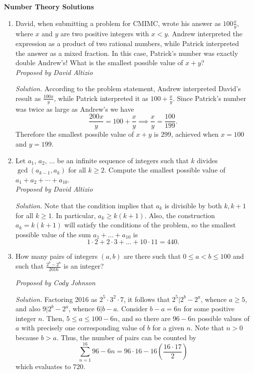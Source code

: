 \documentclass[10pt]{article}
\newcommand{\proposed}[1]
{
\vspace{5pt}
\noindent\textit{Proposed by #1}
}
\newcommand{\solution}
{
\vspace{5pt}
\noindent\textit{Solution.}\qquad
}
\begin{document}
\begin{center}
\huge\textbf{Number Theory Solutions}\normalsize

\vspace{3pt}
\end{center}

\begin{enumerate}
\setlength{\itemsep}{3pt}

\item David, when submitting a problem for CMIMC, wrote his answer as $100\tfrac
	xy$, where $x$ and $y$ are two positive integers with $x<y$. Andrew
	interpreted the expression as a product of two rational numbers, while
	Patrick interpreted the answer as a mixed fraction.  In this case,
	Patrick's number was exactly double Andrew's!  What is the smallest
	possible value of $x+y$? \\

	\proposed{David Altizio}

	\solution According to the problem statement, Andrew interpreted David's
	result as $\frac{100x}{y}$, while Patrick interpreted it as $100 +
	\frac{x}{y}$. Since Patrick's number was twice as large as Andrew's we
	have
	\[
		\frac{200x}{y} = 100 + \frac{x}{y} \implies
		\frac{x}{y} = \frac{100}{199}.
	\]
	Therefore the smallest possible value of $x+y$ is $\boxed{299}$, achieved when
	$x=100$ and $y=199$.



\item Let $a_1$, $a_2$, $\ldots$ be an infinite sequence of integers such that
	$k$ divides $\gcd(a_{k-1},a_k)$ for all $k\geq 2$.  Compute the smallest
	possible value of $a_1+a_2+\cdots+a_{10}$. \\%

	\proposed{David Altizio}

	\solution Note that the condition implies that $a_{k}$ is divisible by
	both $k,k+1$ for all $k \geq 1$. In particular, $a_{k} \geq k(k+1)$.
	Also, the construction $a_{k} = k(k+1)$ will satisfy the conditions of
	the problem, so the smallest possible value of the sum $a_{1} + \ldots +
	a_{10}$ is
	\[
		1 \cdot 2 + 2 \cdot 3 + \ldots + 10\cdot 11 = \boxed{440}.
	\]

\item How many pairs of integers $(a,b)$ are there such that $0\leq a < b \leq 100$ and such that $\tfrac{2^b-2^a}{2016}$ is an integer? %

	\proposed{Cody Johnson}

	\solution Factoring 2016 as $2^{5} \cdot 3^{2} \cdot 7$, it follows that
	$2^{5} | 2^{b} - 2^{a}$, whence $a \geq 5$, and also $9 | 2^{b} -
	2^{a}$, whence $6 | b-a$. Consider $b - a = 6n$ for some positive
	integer $n$. Then, $5 \leq a \leq 100 - 6n$, and so there are $96 - 6n$
	possible values of $a$ with precisely one corresponding value of $b$ for
	a given $n$. Note that $n > 0$ because $b > a$. Thus, the number of pairs 
	can be counted by
	\[
		\sum_{n=1}^{16} 96 - 6n = 96 \cdot 16 - 16 \left(\frac{16 \cdot
		17}{2}\right)
	\]
	which evaluates to $\boxed{720}$.


\end{enumerate}
\end{document}
